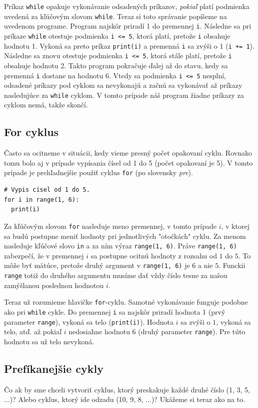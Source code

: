 Príkaz \texttt{while} opakuje vykonávanie odsadených príkazov, \textit{pokiaľ} platí podmienka uvedená za kľúčovým slovom \texttt{while}. Teraz si toto správanie popíšeme na uvedenom programe. Program najskôr priradí 1 do premennej \texttt{i}. Následne sa pri príkaze \texttt{while} otestuje podmienka \texttt{i <= 5}, ktorá platí, pretože \texttt{i} obsahuje hodnotu 1. Vykoná sa preto príkaz \texttt{print(i)} a premenná \texttt{i} sa zvýši o 1 (\texttt{i += 1}). Následne sa znovu otestuje podmienka \texttt{i <= 5}, ktorá stále platí, pretože \texttt{i} obsahuje hodnotu 2. Takto program pokračuje ďalej až do stavu, kedy sa premenná \texttt{i} dostane na hodnotu 6. Vtedy sa podmienka \texttt{i <= 5} nesplní, odsadené príkazy pod cyklom sa nevykonajú a začnú sa vykonávať až príkazy nasledujúce za \texttt{while} cyklom. V tomto prípade náš program žiadne príkazy za cyklom nemá, takže skončí. 

\subsection{For cyklus}
Často sa ocitneme v situácii, kedy vieme presný počet opakovaní cyklu. Rovnako tomu bolo aj v prípade vypísania čísel od 1 do 5 (počet opakovaní je 5). V tomto prípade je prehľadnejšie použiť cyklus \texttt{for} (po slovensky \textit{pre}).
\begin{lstlisting}
# Vypis cisel od 1 do 5.
for i in range(1, 6):
  print(i)
\end{lstlisting}
Za kľúčovým slovom \texttt{for} nasleduje meno premennej, v tomto prípade $i$, v ktorej sa budú postupne meniť hodnoty pri jednotlivých "otočkách" cyklu. Za menom nasleduje kľúčové slovo \texttt{in} a za ním výraz \texttt{range(1, 6)}. Práve \texttt{range(1, 6)} zabezpečí, že v premennej $i$ sa postupne ocitnú hodnoty z rozsahu od $1$ do $5$. To môže byť mätúce, pretože druhý argument v \texttt{range(1, 6)} je $6$ a nie $5$. Funckii \texttt{range} totiž do druhého argumentu musíme dať vždy číslo tesne za našou zamýšlanou poslednou hodnotou $i$.

Teraz už rozumieme hlavičke \texttt{for}-cyklu. Samotné vykonávanie funguje podobne ako pri \texttt{while} cykle. Do premennej \texttt{i} sa najskôr priradí hodnota 1 (prvý parameter \texttt{range}), vykoná sa telo (\texttt{print(i)}). Hodnota $i$ sa zvýši o $1$, vykoná sa telo, atď. až pokiaľ $i$ nedosiahne hodnotu 6 (druhý parameter \texttt{range}). Pre túto hodnotu sa už telo nevykoná.

\subsection{Prefíkanejšie cykly}
Čo ak by sme chceli vytvoriť cyklus, ktorý preskakuje každé druhé číslo (1, 3, 5, ...)? Alebo cyklus, ktorý ide odzadu (10, 9, 8, ...)? Ukážeme si teraz ako na to.

